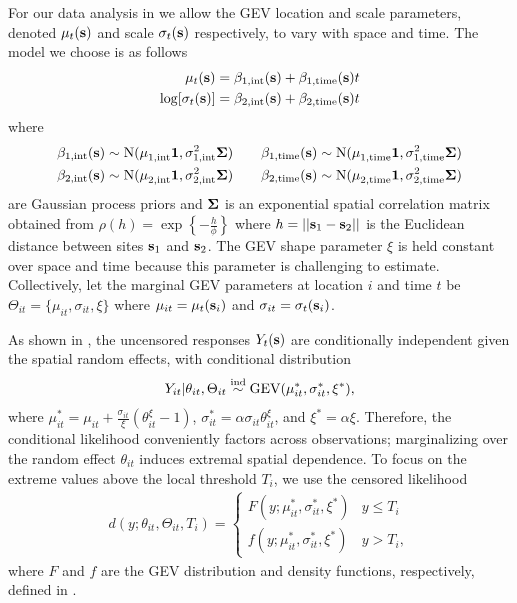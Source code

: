 For our data analysis in  we allow the GEV location and scale parameters, denoted $\mu_t(\mathbf{s})$ and scale $\sigma_t(\mathbf{s})$ respectively, to vary with space and time.
The model we choose is as follows
\begin{align}\label{ebeq:GPprior}
  \mu_t(\mathbf{s}) &= \beta_{1, \text{int}}(\mathbf{s}) + \beta_{1, \text{time}}(\mathbf{s}) t\\
  \log[\sigma_t(\mathbf{s})] &= \beta_{2, \text{int}}(\mathbf{s}) + \beta_{2, \text{time}}(\mathbf{s}) t
\end{align}
where
\begin{align} \label{ebeq:GPhyper}
  \beta_{1, \text{int}}(\mathbf{s}) &\sim \text{N}(\mu^{\phantom{2}}_{1, \text{int}} \mathbf{1}, \sigma^2_{1, \text{int}} \mbox{\boldmath $\Sigma$}) \quad &\beta_{1, \text{time}}(\mathbf{s}) &\sim \text{N}(\mu^{\phantom{2}}_{1, \text{time}} \mathbf{1}, \sigma^2_{1, \text{time}} \mbox{\boldmath $\Sigma$}) \\
  \beta_{2, \text{int}}(\mathbf{s}) &\sim \text{N}(\mu^{\phantom{2}}_{2, \text{int}} \mathbf{1}, \sigma^2_{2, \text{int}} \mbox{\boldmath $\Sigma$}) \quad &\beta_{2, \text{time}}(\mathbf{s}) &\sim \text{N}(\mu^{\phantom{2}}_{2, \text{time}} \mathbf{1}, \sigma^2_{2, \text{time}} \mbox{\boldmath $\Sigma$}) \nonumber
\end{align}
are Gaussian process priors and $\mbox{\boldmath $\Sigma$}$ is an exponential spatial correlation matrix obtained from \mbox{$\rho(h) = \exp\left\{- \frac{h}{\phi}\right\}$} where $h = ||\mathbf{s}_1 - \mathbf{s}_2||$ is the Euclidean distance between sites $\mathbf{s}_1$ and $\mathbf{s}_2$.
The GEV shape parameter $\xi$ is held constant over space and time because this parameter is challenging to estimate.
Collectively, let the marginal GEV parameters at location $i$ and time $t$ be $\Theta_{it} = \{\mu_{it},\sigma_{it},\xi\}$ where $\mu_{it} = \mu_t(\mathbf{s}_i)$ and $\sigma_{it} = \sigma_t(\mathbf{s}_i)$.

As shown in \citet{Reich2012}, the uncensored responses $Y_{t}(\mathbf{s})$ are conditionally independent given the spatial random effects, with conditional distribution
\begin{align} \label{ebeq:Ycond}
   Y_{it}|\theta_{it},\Theta_{it} \stackrel{\mathrm{ind}}{\sim} \mathrm{GEV}(\mu^*_{it}, \sigma_{it}^*,\xi^*),
\end{align}
where $\mu_{it}^* = \mu_{it} + \frac{\sigma_{it}}{\xi}(\theta_{it}^\xi - 1)$,
$\sigma_{it}^* = \alpha\sigma_{it}\theta_{it}^\xi$, and $\xi^* = \alpha\xi$.
Therefore, the conditional likelihood conveniently factors across observations; marginalizing over the random effect $\theta_{it}$ induces extremal spatial dependence.
To focus on the extreme values above the local threshold $T_i$, we use the censored likelihood
\begin{align} \label{ebeq:g}
d(y;\theta_{it},\Theta_{it}, T_i)  = \begin{cases}
  F(y;\mu_{it}^*,\sigma_{it}^*,\xi^*) & y \le T_i \\
  f(y;\mu_{it}^*,\sigma_{it}^*,\xi^*) & y>T_i,
\end{cases}
\end{align}
where $F$ and $f$ are the GEV distribution and density functions, respectively, defined in .

